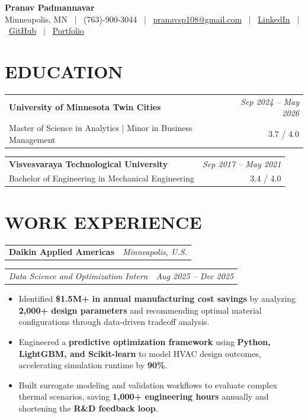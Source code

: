 \documentclass[10pt,letterpaper]{article}
\makeatletter
\newcommand{\roleonly}[2]{%
  \noindent
  \begin{tabularx}{\linewidth}{@{}X r@{}}
    \textit{#1} & \textit{#2}
  \end{tabularx}\vspace{0pt}%
}
\makeatother
\begin{document}

\begin{center}
  {\large\textbf{Pranav Padmannavar}} \\[2pt]
  \small
    Minneapolis, MN \ $|$ \ (763)-900-3044 \ $|$ \ 
    \href{mailto:pranavsp108@gmail.com}{pranavsp108@gmail.com} \ $|$ \ 
    \href{https://www.linkedin.com/in/pranavsp108/}{LinkedIn} \ $|$ \ 
    \href{https://github.com/pranavsp108}{GitHub} \ $|$ \ 
    \href{https://pranavsp108.github.io/}{Portfolio}
\end{center}

\section{EDUCATION}
\noindent
\begin{tabularx}{\linewidth}{@{}X r@{}}
  \textbf{University of Minnesota Twin Cities} & \textit{Sep 2024 -- May 2026 } \\[-1pt]
  Master of Science in Analytics \;|\; Minor in Business Management & 3.7 / 4.0
\end{tabularx}
\vspace{1pt}
\noindent
\begin{tabularx}{\linewidth}{@{}X r@{}}
  \textbf{Visvesvaraya Technological University} & \textit{Sep 2017 -- May 2021 } \\[-1pt]
  Bachelor of Engineering in Mechanical Engineering & 3.4 / 4.0
\end{tabularx}

\section{WORK EXPERIENCE}
\noindent \begin{tabularx}{\linewidth}{@{} X r@{} }
{\fontsize{11pt}{13pt}\selectfont \textbf{Daikin Applied Americas} } & \textit{Minneapolis, U.S.}
\end{tabularx}\vspace{-2pt}
\roleonly{Data Science and Optimization Intern}{Aug 2025 -- Dec 2025 }
\begin{itemize}
  \item Identified \textbf{\$1.5M+ in annual manufacturing cost savings} by analyzing \textbf{2,000+ design parameters} and recommending optimal material configurations through data-driven tradeoff analysis.
  \item Engineered a \textbf{predictive optimization framework} using \textbf{Python, LightGBM, and Scikit-learn} to model HVAC design outcomes, accelerating simulation runtime by \textbf{90\%}.
  \item Built surrogate modeling and validation workflows to evaluate complex thermal scenarios, saving \textbf{1,000+ engineering hours} annually and shortening the \textbf{R\&D feedback loop}.
\end{itemize}
\end{document}

